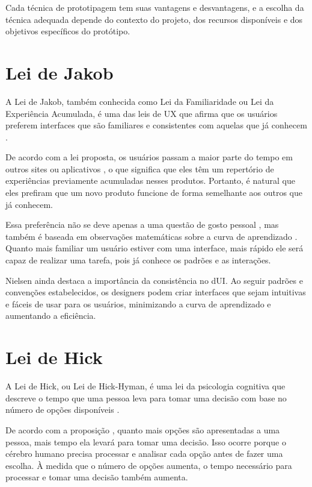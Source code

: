 Cada técnica de prototipagem tem suas vantagens e desvantagens, e a escolha da técnica adequada depende do contexto do projeto, dos recursos disponíveis e dos objetivos específicos do protótipo.

\section{Lei de Jakob }

A Lei de Jakob, também conhecida como Lei da Familiaridade ou Lei da Experiência Acumulada, é uma das leis de \gls{UX} que afirma que os usuários preferem interfaces que são familiares e consistentes com aquelas que já conhecem \cite{yablonski2020leis}.

De acordo com a lei proposta, os usuários passam a maior parte do tempo em outros sites ou aplicativos , o que significa que eles têm um repertório de experiências previamente acumuladas nesses produtos. Portanto, é natural que eles prefiram que um novo produto funcione de forma semelhante aos outros que já conhecem.

Essa preferência não se deve apenas a uma questão de gosto pessoal , mas também é baseada em observações matemáticas sobre a curva de aprendizado . Quanto mais familiar um usuário estiver com uma interface, mais rápido ele será capaz de realizar uma tarefa, pois já conhece os padrões e as interações.

Nielsen ainda destaca a importância da consistência no d\gls{UI}. Ao seguir padrões e convenções estabelecidos, os designers podem criar interfaces que sejam intuitivas e fáceis de usar para os usuários, minimizando a curva de aprendizado e aumentando a eficiência.

\section{Lei de Hick }

A Lei de Hick, ou Lei de Hick-Hyman, é uma lei da psicologia cognitiva que descreve o tempo que uma pessoa leva para tomar uma decisão com base no número de opções disponíveis \cite{yablonski2020leis}.

De acordo com a proposição , quanto mais opções são apresentadas a uma pessoa, mais tempo ela levará para tomar uma decisão. Isso ocorre porque o cérebro humano precisa processar e analisar cada opção antes de fazer uma escolha. À medida que o número de opções aumenta, o tempo necessário para processar e tomar uma decisão também aumenta.

